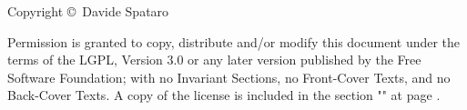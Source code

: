 
\noindent
Copyright \copyright \the\year\ Davide Spataro\par
Permission is granted to copy, distribute and/or modify this document under the terms of the LGPL, Version 3.0 or any later version published by the Free Software Foundation; with no Invariant Sections, no Front-Cover Texts, and no Back-Cover Texts. A copy of the license is included in the section "" at page \pageref{license:gnu}. 
\clearpage




